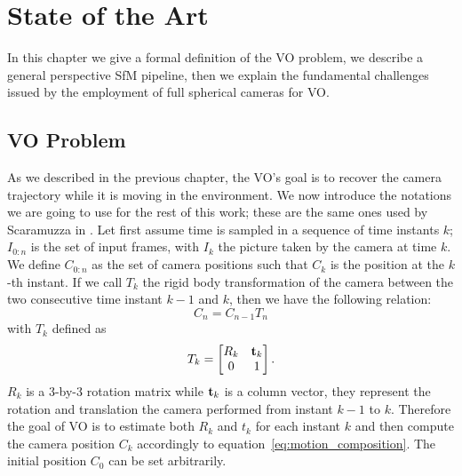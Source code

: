 \chapter{State of the Art}
\label{ch:state_of_the_art}
In this chapter we give a formal definition of the VO problem, we describe a 
general perspective SfM pipeline, then 
we explain the fundamental challenges issued by the employment of full 
spherical cameras for VO.

\section{VO Problem}
\label{sec:vo_problem}
As we described in the previous chapter, the VO's goal is to recover the 
camera trajectory while it is moving in the environment. We now
introduce the notations we are going to use for the rest of this work; 
these are the same ones used by Scaramuzza in \cite{scaramuzzaVisualOdometryI}.
Let first assume time is sampled in a sequence of time instants \(k\); 
\(I_{0:n} \) is the set of input frames, with \(I_{k}\) the picture taken by 
the camera at time
\(k\). We define \(C_{0:n}\) as the set of camera 
positions such that \(C_k\) is the position at the \(k\)-th instant.
If we call \(T_k\) the rigid body transformation of the camera between the two
consecutive time instant $k-1$ and $k$, then we have the following relation:
\begin{equation}
	\label{eq:motion_composition}
C_n = C_{n-1} T_n
\end{equation}
\noindent with \(T_k\) defined as
\begin{equation*}
	T_k =
	\begin{bmatrix}
	R_k & \mathbf{t}_k \\
	0 & 1
	\end{bmatrix} \text{.}
\end{equation*}
\noindent $R_k$ is a 3-by-3 rotation matrix while $\mathbf{t}_k$ is a column vector, 
they represent the rotation and translation the camera performed from instant 
$k-1$ to $k$.
Therefore the goal of VO is to estimate both $R_k$ and $t_k$ for each instant 
$k$ and then compute the camera position $C_k$ accordingly to 
equation~\ref{eq:motion_composition}.
The initial position $C_0$ can be set arbitrarily.


